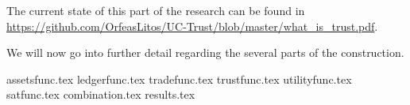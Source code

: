   The current state of this part of the research can be found in
  \url{https://github.com/OrfeasLitos/UC-Trust/blob/master/what_is_trust.pdf}.

  We will now go into further detail regarding the several parts of the construction.

  {assetsfunc.tex}
  {ledgerfunc.tex}
  {tradefunc.tex}
  {trustfunc.tex}
  {utilityfunc.tex}
  {satfunc.tex}
  {combination.tex}
  {results.tex}
